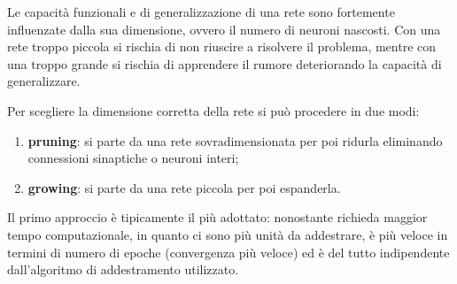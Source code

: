 Le capacità funzionali e di generalizzazione di una rete sono fortemente influenzate dalla sua dimensione, ovvero il numero di neuroni nascosti. Con una rete troppo piccola si rischia di non riuscire a risolvere il problema, mentre con una troppo grande si rischia di apprendere il rumore deteriorando la capacità di generalizzare.

Per scegliere la dimensione corretta della rete si può procedere in due modi:
\begin{enumerate}
	\item \textbf{pruning}: si parte da una rete sovradimensionata per poi ridurla eliminando connessioni sinaptiche o neuroni interi;
	\item \textbf{growing}: si parte da una rete piccola per poi espanderla.
\end{enumerate}
Il primo approccio è tipicamente il più adottato: nonostante richieda maggior tempo computazionale, in quanto ci sono più unità da addestrare, è più veloce in termini di numero di epoche (convergenza più veloce) ed è del tutto indipendente dall'algoritmo di addestramento utilizzato.

